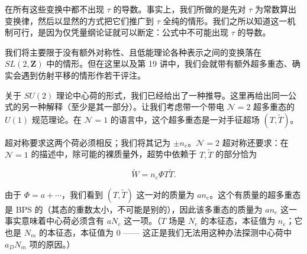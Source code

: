 在所有这些变换中都不出现 $\tau$ 的导数。事实上，我们所做的是先对 $\tau$ 为常数算出变换律，然后以显然的方式把它们推广到 $\tau$ 全纯的情形。我们之所以知道这一机制可行，是因为仅凭量纲论证就可以断定：公式中不可能出现 $\tau$ 的导数。


我们将主要限于没有额外对称性、且低能理论各种表示之间的变换落在 $SL(2,\mathbf{Z})$ 中的情形。但在这里以及第 19 讲中，我们会就带有额外超多重态、确实会遇到仿射平移的情形作若干评注。

关于 $SU(2)$ 理论中心荷的形式，我们已经给出了一种推导。这里再给出同一公式的另一种解释（至少是其一部分）。让我们考虑带一个带电 $\mathcal{N}=2$ 超多重态的 $U(1)$ 规范理论。在 $\mathcal{N}=1$ 的语言中，这个超多重态是一对手征超场 $(T,\tilde T)$。


超对称要求这两个荷必须相反；我们将其记为 $\pm n_e$。$\mathcal{N}=2$ 超对称还要求：在 $\mathcal{N}=1$ 的描述中，除可能的裸质量外，超势中依赖于 $T,\tilde T$ 的部分恰为

\[
  \tilde W=n_e\Phi T\tilde T .
\]

由于 $\Phi=a+\cdots$，我们看到 $(T,\tilde T)$ 这一对的质量为 $an_e$。这个有质量的超多重态是 BPS 的（其态的重数太小，不可能是别的），因此该多重态的质量为 $an_e$ 这一事实意味着中心荷必须含有 $aN_e$ 这一项。（$T$ 场是 $N_e$ 的本征态，本征值为 $n_e$；它也是 $N_m$ 的本征态，本征值为 $0$ —— 这正是我们无法用这种办法探测中心荷中 $a_DN_m$ 项的原因。）


